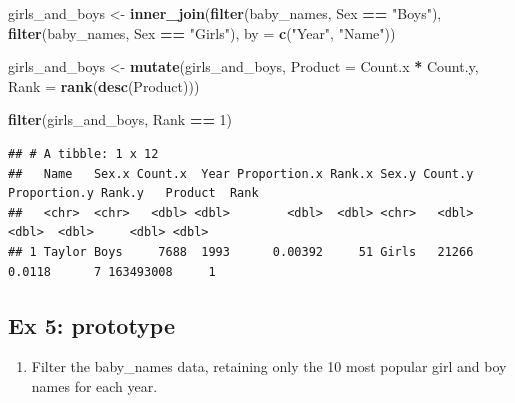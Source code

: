 \documentclass[]{book}
\newenvironment{Shaded}{\begin{snugshade}}{\end{snugshade}}
\newcommand{\KeywordTok}[1]{\textcolor[rgb]{0.13,0.29,0.53}{\textbf{#1}}}
\newcommand{\DataTypeTok}[1]{\textcolor[rgb]{0.13,0.29,0.53}{#1}}
\newcommand{\DecValTok}[1]{\textcolor[rgb]{0.00,0.00,0.81}{#1}}
\newcommand{\StringTok}[1]{\textcolor[rgb]{0.31,0.60,0.02}{#1}}
\newcommand{\OperatorTok}[1]{\textcolor[rgb]{0.81,0.36,0.00}{\textbf{#1}}}
\newcommand{\NormalTok}[1]{#1}
\providecommand{\tightlist}{%
  \setlength{\itemsep}{0pt}\setlength{\parskip}{0pt}}
\begin{document}
\begin{Shaded}
\begin{Highlighting}[]
\NormalTok{girls_and_boys <-}\StringTok{ }\KeywordTok{inner_join}\NormalTok{(}\KeywordTok{filter}\NormalTok{(baby_names, Sex }\OperatorTok{==}\StringTok{ "Boys"}\NormalTok{), }
                             \KeywordTok{filter}\NormalTok{(baby_names, Sex }\OperatorTok{==}\StringTok{ "Girls"}\NormalTok{),}
                             \DataTypeTok{by =} \KeywordTok{c}\NormalTok{(}\StringTok{"Year"}\NormalTok{, }\StringTok{"Name"}\NormalTok{))}

\NormalTok{girls_and_boys <-}\StringTok{ }\KeywordTok{mutate}\NormalTok{(girls_and_boys,}
                         \DataTypeTok{Product =}\NormalTok{ Count.x }\OperatorTok{*}\StringTok{ }\NormalTok{Count.y,}
                         \DataTypeTok{Rank =} \KeywordTok{rank}\NormalTok{(}\KeywordTok{desc}\NormalTok{(Product)))}

\KeywordTok{filter}\NormalTok{(girls_and_boys, Rank }\OperatorTok{==}\StringTok{ }\DecValTok{1}\NormalTok{)}
\end{Highlighting}
\end{Shaded}

\begin{verbatim}
## # A tibble: 1 x 12
##   Name   Sex.x Count.x  Year Proportion.x Rank.x Sex.y Count.y Proportion.y Rank.y   Product  Rank
##   <chr>  <chr>   <dbl> <dbl>        <dbl>  <dbl> <chr>   <dbl>        <dbl>  <dbl>     <dbl> <dbl>
## 1 Taylor Boys     7688  1993      0.00392     51 Girls   21266       0.0118      7 163493008     1
\end{verbatim}

\subsection{Ex 5: prototype}\label{ex-5-prototype}

\begin{enumerate}
\def\labelenumi{\arabic{enumi}.}
\tightlist
\item
  Filter the baby\_names data, retaining only the 10 most popular girl
  and boy names for each year.
\end{enumerate}

\begin{Shaded}
\end{Shaded}
\end{document}
